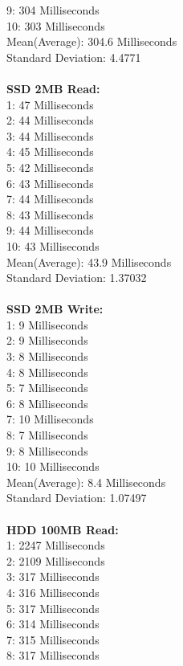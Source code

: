 \documentclass{article}
\begin{document}
9: 304 Milliseconds
\\
10: 303 Milliseconds
\\
Mean(Average): 304.6 Milliseconds
\\
Standard Deviation: 4.4771
\\
\\
\textbf{SSD 2MB Read:}
\\
1: 47 Milliseconds
\\
2: 44 Milliseconds
\\
3: 44 Milliseconds
\\
4: 45 Milliseconds
\\
5: 42 Milliseconds
\\
6: 43 Milliseconds
\\
7: 44 Milliseconds
\\
8: 43 Milliseconds
\\
9: 44 Milliseconds
\\
10: 43 Milliseconds
\\
Mean(Average): 43.9 Milliseconds
\\
Standard Deviation: 1.37032
\\
\\
\textbf{SSD 2MB Write:}
\\
1: 9 Milliseconds
\\
2: 9 Milliseconds
\\
3: 8 Milliseconds
\\
4: 8 Milliseconds
\\
5: 7 Milliseconds
\\
6: 8 Milliseconds
\\
7: 10 Milliseconds
\\
8: 7 Milliseconds
\\ 
9: 8 Milliseconds
\\
10: 10 Milliseconds
\\
Mean(Average): 8.4 Milliseconds
\\
Standard Deviation: 1.07497
\\
\\
\textbf{HDD 100MB Read:}
\\
1: 2247 Milliseconds
\\
2: 2109 Milliseconds
\\
3: 317 Milliseconds
\\
4: 316 Milliseconds
\\
5: 317 Milliseconds
\\
6: 314 Milliseconds
\\
7: 315 Milliseconds
\\
8: 317 Milliseconds
\\
\end{document}
